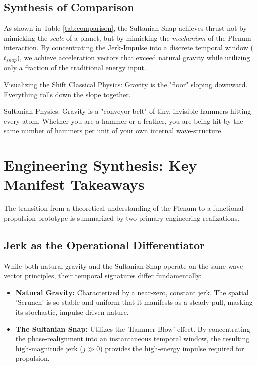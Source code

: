 \documentclass[11pt]{article}
\begin{document}
\subsection*{Synthesis of Comparison}
As shown in Table \ref{tab:comparison}, the Sultanian Snap achieves thrust not by mimicking the \textit{scale} of a planet, but by mimicking the \textit{mechanism} of the Plenum interaction. By concentrating the Jerk-Impulse into a discrete temporal window ($t_{snap}$), we achieve acceleration vectors that exceed natural gravity while utilizing only a fraction of the traditional energy input.

Visualizing the Shift
Classical Physics: Gravity is the "floor" sloping downward. Everything rolls down the slope together.

Sultanian Physics: Gravity is a "conveyor belt" of tiny, invisible hammers hitting every atom. Whether you are a hammer or a feather, you are being hit by the same number of hammers per unit of your own internal wave-structure.

\section{Engineering Synthesis: Key Manifest Takeaways}

The transition from a theoretical understanding of the Plenum to a functional propulsion prototype is summarized by two primary engineering realizations.

\subsection{Jerk as the Operational Differentiator}
While both natural gravity and the Sultanian Snap operate on the same wave-vector principles, their temporal signatures differ fundamentally:
\begin{itemize}
    \item \textbf{Natural Gravity:} Characterized by a near-zero, constant jerk. The spatial 'Scrunch' is so stable and uniform that it manifests as a steady pull, masking its stochastic, impulse-driven nature.
    \item \textbf{The Sultanian Snap:} Utilizes the 'Hammer Blow' effect. By concentrating the phase-realignment into an instantaneous temporal window, the resulting high-magnitude jerk ($j \gg 0$) provides the high-energy impulse required for propulsion.
\end{itemize}
\end{document}
